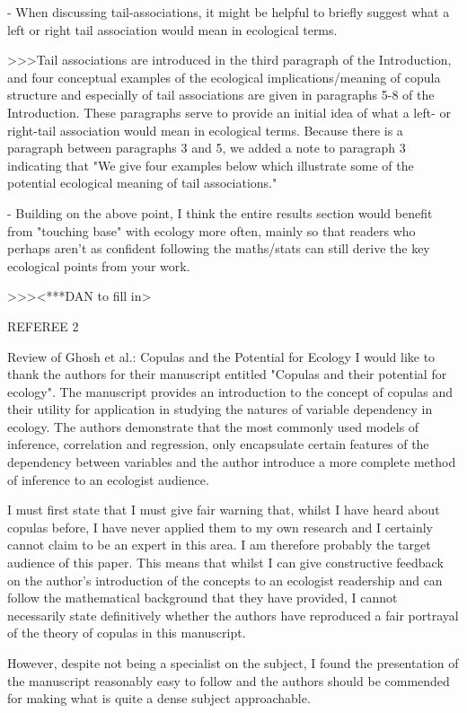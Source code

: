 - When discussing tail-associations, it might be helpful to briefly suggest what a left or right tail association would mean in ecological terms.

>>>Tail associations are introduced in the third paragraph of the Introduction, and four 
conceptual examples of the ecological implications/meaning of copula structure and especially 
of tail associations are given in paragraphs 5-8 of the Introduction. These paragraphs 
serve to provide an initial idea of what a left- or right-tail association would mean 
in ecological terms. Because there is a paragraph between paragraphs 3 and 5, we added 
a note to paragraph 3 indicating that "We give four examples below which illustrate some of the 
potential ecological meaning of tail associations."

- Building on the above point, I think the entire results section would benefit from "touching base" with ecology more often, mainly so that readers who perhaps aren't as confident following the maths/stats can still derive the key ecological points from your work.

>>><***DAN to fill in>


REFEREE 2

Review of Ghosh et al.: Copulas and the Potential for Ecology
I would like to thank the authors for their manuscript entitled "Copulas and their potential 
for ecology".  The manuscript provides an introduction to the concept of copulas and their 
utility for application in studying the natures of variable dependency in ecology.  The 
authors demonstrate that the most commonly used models of inference, correlation and regression, 
only encapsulate certain features of the dependency between variables and the author introduce a 
more complete method of inference to an ecologist audience.

I must first state that I must give fair warning that, whilst I have heard about copulas before, 
I have never applied them to my own research and I certainly cannot claim to be an expert in this 
area.  I am therefore probably the target audience of this paper.  This means that whilst I can 
give constructive feedback on the author's introduction of the concepts to an ecologist readership 
and can follow the mathematical background that they have provided, I cannot necessarily state 
definitively whether the authors have reproduced a fair portrayal of the theory of copulas in this 
manuscript.

However, despite not being a specialist on the subject, I found the presentation of the manuscript 
reasonably easy to follow and the authors should be commended for making what is quite a dense 
subject approachable.  

